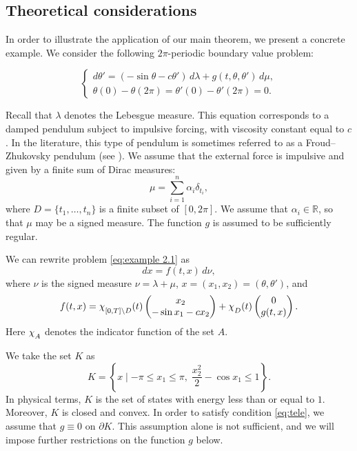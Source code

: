 \documentclass[a4paper,11pt]{amsart}
\theoremstyle{plain}
\theoremstyle{remark}
\numberwithin{equation}{section}
\newcommand{\carac}[1]{\chi_{\raisebox{-.5ex}{$\scriptstyle #1$}}}
\begin{document}
\subsection{Theoretical considerations}

In order to illustrate the application of our main theorem, we present a concrete example. We consider the following $2\pi$-periodic boundary value problem:

\begin{equation}
	\left\lbrace \begin{array}{l}
		d\theta'= (-\sin \theta-c\theta') \, d\lambda+g(t,\theta,\theta')\,d\mu,    \\
		\theta(0)-\theta(2\pi)=\theta'(0)-\theta'(2\pi)=0.
	\end{array}\right. \label{eq:example 2.1}
\end{equation}

Recall that $\lambda$ denotes the Lebesgue measure. This equation corresponds to a damped pendulum subject to impulsive forcing, with viscosity constant equal to $c$. In the literature, this type of pendulum is sometimes referred to as a Froud--Zhukovsky pendulum (see \cite[VI, 4]{S.Schwabik320}). We assume that the external force is impulsive and given by a finite sum of Dirac measures:
\[
\mu=\sum_{i=1}^{n}\alpha_i\delta_{t_i},
\]
where $D=\{t_1,\ldots,t_n\}$ is a finite subset of $[0,2\pi]$. We assume that $\alpha_i\in\mathbb{R}$, so that $\mu$ may be a signed measure. The function $g$ is assumed to be sufficiently regular.

We can rewrite problem \eqref{eq:example 2.1} as
\[
dx=f(t,x) \, d\nu,
\]
where $\nu$ is the signed measure $\nu=\lambda+\mu$, $x=(x_1,x_2)=(\theta,\theta')$, and
\[
f(t,x)=\carac{[0,T]\setminus D}(t)
    \begin{pmatrix}
     x_2\\
     -\sin x_1-cx_2
    \end{pmatrix}
 +\carac{D}(t)
     \begin{pmatrix}
     0\\
     g(t,x)
    \end{pmatrix}.
\]
Here $\carac{A}$ denotes the indicator function of the set $A$.

We take the set $K$ as
$$K=\left\{x\mid  -\pi\leq x_1\leq \pi,\; \frac{x_2^2}{2}-\cos x_1\leq 1\right\}.$$
In physical terms, $K$ is the set of states with energy less than or equal to $1$. Moreover, $K$ is closed and convex. In order to satisfy condition \ref{eq:tele}, we assume that $g\equiv 0$ on $\partial K$. This assumption alone is not sufficient, and we will impose further restrictions on the function $g$ below.
\end{document}
